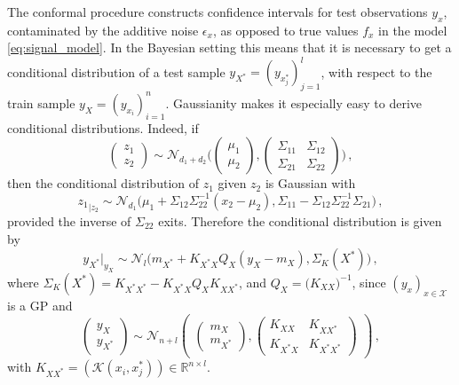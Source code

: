\documentclass{ITaSconf}
\newcommand{\Ncal}{\mathcal{N}}
\newcommand{\Kcal}{\mathcal{K}}
\newcommand{\Xcal}{\mathcal{X}}
\newcommand{\Real}{\mathbb{R}}
\begin{document}
The conformal procedure constructs confidence intervals for test observations $y_x$,
contaminated by the additive noise $\epsilon_x$, as opposed to true values $f_x$ in
the model \ref{eq:signal_model}. In the Bayesian setting this means that it is necessary
to get a conditional distribution of a test sample $y_{X^*} = (y_{x^*_j})_{j=1}^l$,
with respect to the train sample $y_X = (y_{x_i})_{i=1}^n$. Gaussianity makes it
especially easy to derive conditional distributions. Indeed, if
\begin{equation*}
  \begin{pmatrix}z_1 \\ z_2\end{pmatrix}
    \sim \Ncal_{d_1+d_2}\Biggl(
      \begin{pmatrix} \mu_1 \\ \mu_2 \end{pmatrix},
      \begin{pmatrix}
        \Sigma_{11} & \Sigma_{12} \\
        \Sigma_{21} & \Sigma_{22}
      \end{pmatrix}
    \Biggr)
    \,,
\end{equation*}
then the conditional distribution of $z_1$ given $z_2$ is Gaussian with
\begin{equation*}
  {z_1}_{|z_2}
    \sim \Ncal_{d_1}\bigl(
      \mu_1 + \Sigma_{12}\Sigma_{22}^{-1}(x_2-\mu_2),
      \Sigma_{11} - \Sigma_{12}\Sigma_{22}^{-1}\Sigma_{21}
    \bigr)
    \,,
\end{equation*}
provided the inverse of $\Sigma_{22}$ exits. Therefore the conditional distribution
is given by
\begin{equation} \label{eq:cond_distr}
  y_{X^*}\vert_{y_X}
    \sim \Ncal_l\bigl(
      m_{X^*} + K_{X^*X} Q_X (y_X - m_X),
      \Sigma_K(X^*)
    \bigr)
    \,,
\end{equation}
where $\Sigma_K(X^*) = K_{X^*X^*} - K_{X^*X} Q_X K_{XX^*}$, and
$Q_X = \bigl(K_{XX}\bigr)^{-1}$, since $(y_x)_{x\in\Xcal}$ is a GP and
\begin{equation*}
  \begin{pmatrix} y_X \\ y_{X^*} \end{pmatrix}
    \sim \Ncal_{n+l}\begin{pmatrix}
      \begin{pmatrix} m_X \\ m_{X^*} \end{pmatrix},
      \begin{pmatrix}
        K_{XX} & K_{XX^*} \\
        K_{X^*X} & K_{X^*X^*}
      \end{pmatrix}
    \end{pmatrix}
    \,,
\end{equation*}
with $K_{XX^*} = (\Kcal(x_i, x^*_j))\in \Real^{n\times l}$.
\end{document}
